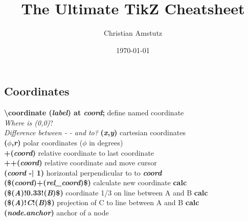 \documentclass[10pt]{article}
\title{The Ultimate TikZ Cheatsheet}
\author{Christian Amstutz}
\date{\today}
\newcommand{\tikzcmd}[1]{\textbf{#1}}
\newcommand{\tikzparam}[1]{\textbf{\emph{#1}}}
\newcommand{\tikzlib}[1]{\textbf{#1}}
\begin{document}
    \maketitle

    \begin{multicols}{2}

        \section{Coordinates}
        \tikzcmd{\textbackslash coordinate (\tikzparam{label}) at \tikzparam{coord};} define named coordinate\\
        \emph{Where is (0,0)}?\\
        \emph{Difference between - - and to?}
        \tikzcmd{(\tikzparam{x},\tikzparam{y})} cartesian coordinates\\
        \tikzcmd{(\tikzparam{$\phi$},\tikzparam{r})} polar coordinates ($\phi$ in degrees)\\
        \tikzcmd{+(\tikzparam{coord})} relative coordinate to last coordinate\\
        \tikzcmd{++(\tikzparam{coord})} relative coordinate and move cursor\\
        \tikzcmd{(\tikzparam{coord} -| 1)} horizontal perpendicular to to \tikzparam{coord}\\
        \tikzcmd{(\$(\tikzparam{coord})+(\tikzparam{rel\_coord})\$)} calculate new coordinate \tikzlib{calc}\\
        \tikzcmd{(\$(\tikzparam{A})!0.33!(\tikzparam{B})\$)} coordinate 1/3 on line between A and B \tikzlib{calc}\\
        \tikzcmd{(\$(\tikzparam{A})!\tikzparam{C}!(\tikzparam{B})\$)} projection of C to line between A and B \tikzlib{calc}\\
        \tikzcmd{(\tikzparam{node}.\tikzparam{anchor})} anchor of a node


\end{multicols}
\end{document}
